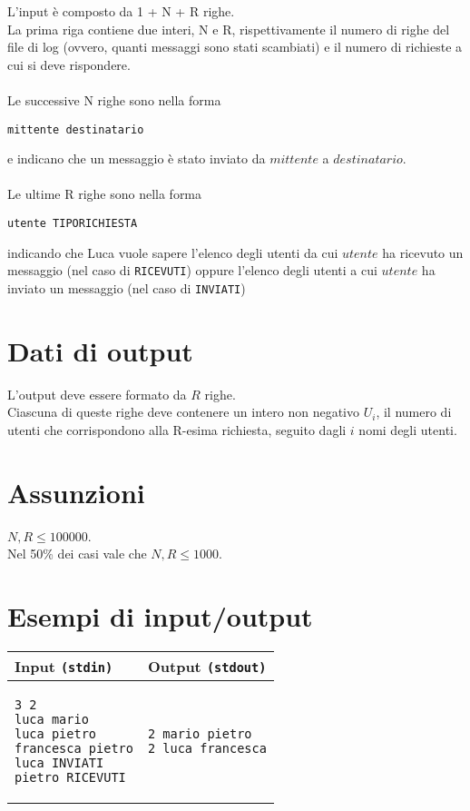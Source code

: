 \documentclass[a4paper,11pt]{article}
\begin{document}
L'input è composto da 1 + N + R righe. \\
La prima riga contiene due interi, N e R, rispettivamente il numero di righe del file di log (ovvero, quanti messaggi sono stati scambiati) e il numero di richieste a cui si deve rispondere.\\ \\
Le successive N righe sono nella forma
\begin{verbatim}
mittente destinatario
\end{verbatim} e indicano che un messaggio è stato inviato da $mittente$ a $destinatario$.\\ \\
Le ultime R righe sono nella forma
\begin{verbatim}
utente TIPORICHIESTA
\end{verbatim}
indicando che Luca vuole sapere l'elenco degli utenti da cui $utente$ ha ricevuto un messaggio (nel caso di \verb|RICEVUTI|) oppure l'elenco degli utenti a cui $utente$ ha inviato un messaggio (nel caso di \verb|INVIATI|)

\section*{Dati di output}
  
L'output deve essere formato da $R$ righe.\\
Ciascuna di queste righe deve contenere un intero non negativo $U_i$, il numero di utenti che corrispondono alla R-esima richiesta, seguito dagli $i$ nomi degli utenti.
    
  \section*{Assunzioni}

$N, R \leq 100000$. \\Nel 50\% dei casi vale che $N, R \leq 1000$.
    
\section*{Esempi di input/output}

  
    \noindent
    \begin{tabular}{p{8cm}|p{8cm}}
    \toprule
    \textbf{Input \texttt{(stdin)}}
    & \textbf{Output \texttt{(stdout)}}
    \\
    \midrule
    \small
    \begin{verbatim}
3 2
luca mario
luca pietro
francesca pietro
luca INVIATI
pietro RICEVUTI

      \end{verbatim}
    &
    \small
    \begin{verbatim}
2 mario pietro
2 luca francesca
      \end{verbatim}
    \\
    \bottomrule
    \end{tabular}
  
\end{document}
